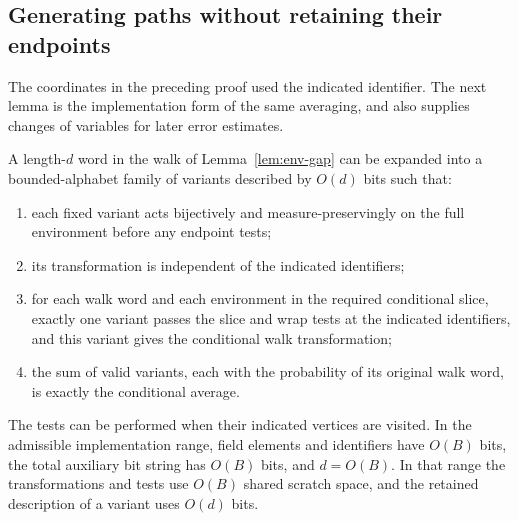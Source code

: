 \subsection{Generating paths without retaining their endpoints}

The coordinates in the preceding proof used the indicated identifier.
The next lemma is the implementation form of the same averaging,
and also supplies changes of variables for later error estimates.

\begin{lemma}\label{lem:env-variants}
A length-$d$ word in the walk of Lemma~\ref{lem:env-gap} can be expanded
into a bounded-alphabet family of variants described by $O(d)$ bits
such that:
\begin{enumerate}
\item each fixed variant acts bijectively and measure-preservingly on
the full environment before any endpoint tests;
\item its transformation is independent of the indicated identifiers;
\item for each walk word and each environment in the required
conditional slice, exactly one variant passes the slice and wrap
tests at the indicated identifiers, and this variant gives the
conditional walk transformation;
\item the sum of valid variants, each with the probability of its
original walk word, is exactly the conditional average.
\end{enumerate}
The tests can be performed when their indicated vertices are visited.
In the admissible implementation range, field elements and identifiers
have $O(B)$ bits, the total auxiliary bit string has $O(B)$ bits, and $d=O(B)$.
In that range the transformations and tests use $O(B)$ shared scratch space, and
the retained description of a variant uses $O(d)$ bits.
\end{lemma}

